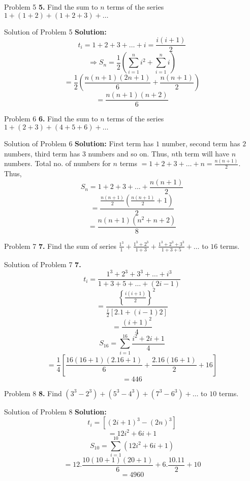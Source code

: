 \documentclass[aspectratio=1610,8pt]{beamer}
\begin{document}
\begin{frame}{Problem 5}
  \textbf{5.} Find the sum to $n$ terms of the series $1 + (1 + 2) + (1 + 2 + 3) + \ldots$
\end{frame}
\begin{frame}{Solution of Problem 5}
  \textbf{Solution:} $$t_i = 1 + 2 + 3 + \ldots + i = \frac{i(i + 1)}{2}$$
  $$\Rightarrow S_n = \frac{1}{2}\left(\sum_{i = 1}^n i^2 + \sum_{i = 1}^ni\right)$$
  $$= \frac{1}{2}\left(\frac{n(n + 1)(2n + 1)}{6} + \frac{n(n + 1)}{2}\right)$$
  $$= \frac{n(n + 1)(n + 2)}{6}$$
\end{frame}
\begin{frame}{Problem 6}
  \textbf{6.} Find the sum to $n$ terms of the series $1 + (2 + 3) + (4 + 5 + 6) + \ldots$
\end{frame}
\begin{frame}{Solution of Problem 6}
  \textbf{Solution:} First term has $1$ number, second term has $2$ numbers, third term has $3$ numbers and so on. Thus, $n$th term
  will have $n$ numbers. Total no. of numbers for $n$ terms $= 1 + 2 + 3 + \ldots + n = \frac{n(n + 1)}{2}.$ Thus,
  $$S_n = 1 + 2 + 3 + ... + \frac{n(n + 1)}{2}$$
  $$= \frac{\frac{n(n + 1)}{2}\left(\frac{n(n + 1)}{2} + 1\right)}{2}$$
  $$= \frac{n(n + 1)(n^2 + n + 2)}{8}$$
\end{frame}
\begin{frame}{Problem 7}
  \textbf{7.} Find the sum of series $\frac{1^3}{1} + \frac{1^3 + 2^3}{1 + 3} + \frac{1^3 + 2^3 + 3^3}{1 + 3 + 5} + \ldots$ to $16$ terms.
\end{frame}
\begin{frame}{Solution of Problem 7}
  \textbf{7.} $$t_i = \frac{1^3 + 2^3 + 3^3 + \ldots + i^3}{1 + 3 + 5 + \ldots + (2i - 1)}$$
  $$= \frac{\left\{\frac{i(i + 1)}{2}\right\}^2}{\frac{i}{2}[2.1 + (i - 1)2]}$$
  $$= \frac{(i + 1)^2}{4}$$
  $$S_{16} = \sum_{i = 1}^{16}\frac{i^2 + 2i + 1}{4}$$
  $$= \frac{1}{4}\left[\frac{16(16 + 1)(2.16 + 1)}{6} + \frac{2.16(16 + 1)}{2} + 16\right]$$
  $$= 446$$
\end{frame}
\begin{frame}{Problem 8}
  \textbf{8.} Find $(3^3 - 2^3) + (5^3 - 4^3) + (7^3 - 6^3) + \ldots$ to $10$ terms.
\end{frame}
\begin{frame}{Solution of Problem 8}
  \textbf{Solution:} $$t_i = [(2i + 1)^3 - (2n)^3]$$
  $$= 12i^2 + 6i + 1$$
  $$S_{10} = \sum_{i = 1}^{10}(12i^2 + 6i + 1)$$
  $$= 12.\frac{10(10 + 1)(20 + 1)}{6} + 6.\frac{10.11}{2} + 10$$
  $$= 4960$$
\end{frame}
\end{document}
